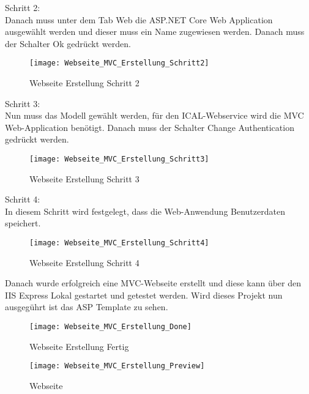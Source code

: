 {Schritt 2:\\
Danach muss unter dem Tab Web die ASP.NET Core Web Application ausgewählt werden und dieser muss ein Name zugewiesen werden. Danach muss der Schalter Ok gedrückt werden.\\
\begin{figure}[H]
    \texttt{[image: Webseite\_MVC\_Erstellung\_Schritt2]}
    \caption{Webseite Erstellung Schritt 2}
    \label{fig:weberstell2}
\end{figure}
Schritt 3:\\
Nun muss das Modell gewählt werden, für den ICAL-Webservice wird die MVC Web-Application benötigt. Danach muss der Schalter Change Authentication gedrückt werden. \\
\begin{figure}[H]
    \texttt{[image: Webseite\_MVC\_Erstellung\_Schritt3]}
    \caption{Webseite Erstellung Schritt 3}
    \label{fig:weberstell3}
\end{figure}Schritt 4:\\
In diesem Schritt wird festgelegt, dass die Web-Anwendung Benutzerdaten speichert.
\begin{figure}[H]
    \texttt{[image: Webseite\_MVC\_Erstellung\_Schritt4]}
    \caption{Webseite Erstellung Schritt 4}
    \label{fig:weberstell4}
\end{figure}
Danach wurde erfolgreich eine MVC-Webseite erstellt und diese kann über den IIS Express Lokal gestartet und getestet werden. Wird dieses Projekt nun ausgegührt ist das ASP Template zu sehen.\\
\begin{figure}[H]
    \texttt{[image: Webseite\_MVC\_Erstellung\_Done]}
    \caption{Webseite Erstellung Fertig}
    \label{fig:weberstellfertig}
\end{figure}
\begin{figure}[H]
    \texttt{[image: Webseite\_MVC\_Erstellung\_Preview]}
    \caption{Webseite}
    \label{fig:webseite}
\end{figure}
}
